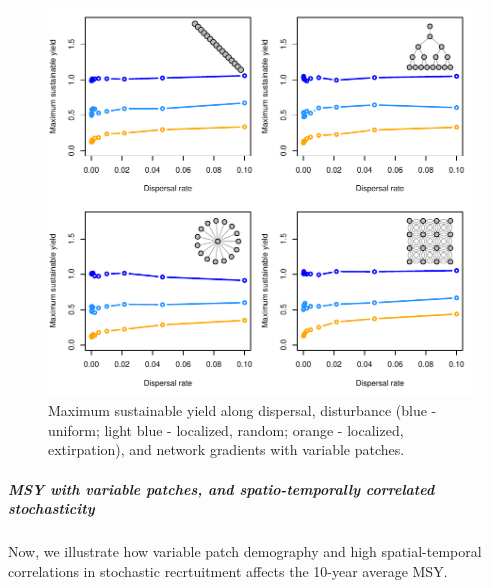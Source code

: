 \documentclass[]{article}
\let\oldsubparagraph\subparagraph
\renewcommand{\subparagraph}[1]{\oldsubparagraph{#1}\mbox{}}
\begin{document}
\begin{figure}[H]

{\centering \includegraphics{Managing_for_ecological_surprises_in_metapopulations_makeHTML_files/figure-latex/MSY with variable patches and stochasticity-1} 

}

\caption{Maximum sustainable yield along dispersal, disturbance (blue - uniform; light blue - localized, random; orange - localized, extirpation), and network gradients with variable patches.}\label{fig:MSY with variable patches and stochasticity}
\end{figure}

\subparagraph{MSY with variable patches, and spatio-temporally
correlated
stochasticity}\label{msy-with-variable-patches-and-spatio-temporally-correlated-stochasticity}

Now, we illustrate how variable patch demography and high
spatial-temporal correlations in stochastic recrtuitment affects the
10-year average MSY.
\end{document}
